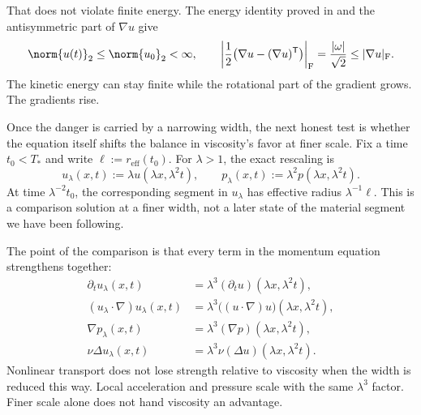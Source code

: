 That does not violate finite energy. The energy identity proved in  and the antisymmetric part of \(\nabla u\) give
\[
  \norm{u(t)}_2
  \leq
  \norm{u_0}_2
  <\infty,
  \qquad
  \left|\frac12\bigl(\nabla u-(\nabla u)^{\mathsf T}\bigr)\right|_{\mathrm F}
  =
  \frac{|\omega|}{\sqrt2}
  \leq
  |\nabla u|_{\mathrm F}.
\]
The kinetic energy can stay finite while the rotational part of the gradient grows. The gradients rise.


Once the danger is carried by a narrowing width, the next honest test is whether the equation itself shifts the balance in viscosity's favor at finer scale. Fix a time \(t_0<T_*\) and write \(\ell:=r_{\mathrm{eff}}(t_0)\). For \(\lambda>1\), the exact \NavierStokes{} rescaling is
\[
  u_\lambda(x,t)
  :=
  \lambda u(\lambda x,\lambda^2t),
  \qquad
  p_\lambda(x,t)
  :=
  \lambda^2p(\lambda x,\lambda^2t).
\]
At time \(\lambda^{-2}t_0\), the corresponding segment in \(u_\lambda\) has effective radius \(\lambda^{-1}\ell\). This is a comparison solution at a finer width, not a later state of the material segment we have been following.

The point of the comparison is that every term in the momentum equation strengthens together:
\[
\begin{aligned}
  \partial_tu_\lambda(x,t)
  &=
  \lambda^3(\partial_tu)(\lambda x,\lambda^2t),
  \\
  (u_\lambda\cdot\nabla)u_\lambda(x,t)
  &=
  \lambda^3\bigl((u\cdot\nabla)u\bigr)(\lambda x,\lambda^2t),
  \\
  \nabla p_\lambda(x,t)
  &=
  \lambda^3(\nabla p)(\lambda x,\lambda^2t),
  \\
  \nu\Delta u_\lambda(x,t)
  &=
  \lambda^3\nu(\Delta u)(\lambda x,\lambda^2t).
\end{aligned}
\]
Nonlinear transport does not lose strength relative to viscosity when the width is reduced this way. Local acceleration and pressure scale with the same \(\lambda^3\) factor. Finer scale alone does not hand viscosity an advantage.


